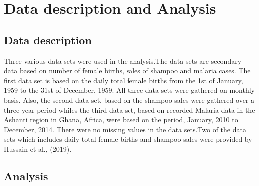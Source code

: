 \documentclass[12pt, letterpaper, twoside]{article}
\begin{document}
\section{Data description and Analysis}
\subsection{Data description}
Three various data sets were used in the analysis.The data sets are secondary data based on number of female births, sales of shampoo and malaria cases. The first data set is based on the daily total female births from the 1st of January, 1959 to the 31st of December, 1959. All three data sets were gathered on monthly basis. Also, the second data set, based on the shampoo sales were gathered over a three year period whiles the third data set, based on recorded Malaria data in the Ashanti region in Ghana, Africa, were based on the period, January, 2010 to December, 2014. There were no missing values in the data sets.Two of the data sets which includes daily total female births and shampoo sales were provided by Hussain et al., (2019).
\subsection{Analysis}
\end{document}
